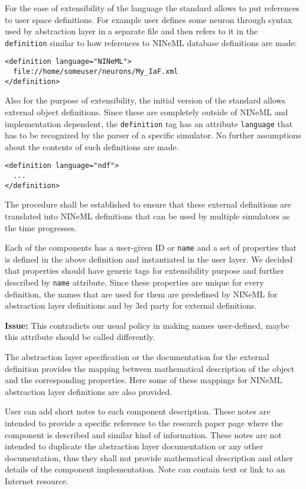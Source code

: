 \documentclass{article}
\newcommand{\issue}[1]{%
\begin{center}
\colorbox{issuecolor}{\parbox{0.8\linewidth}{\textbf{Issue:} #1}}
\end{center}%
}
\begin{document}
For the ease of extensibility of the language the standard
allows to put references to user space definitions. For example user defines some
neuron through syntax used by abstraction layer in a separate file and then refers
to it in the {\tt definition} similar to how references to NINeML database definitions
are made:
\begin{verbatim}
<definition language="NINeML">
  file://home/someuser/neurons/My_IaF.xml
</definition>
\end{verbatim}

Also for the purpose of extensibility, the initial version of the standard allows
external object definitions. Since these are completely outside of NINeML and
implementation dependent, the {\tt definition} tag has an attribute {\tt language}
that has to be recognized by the parser of a specific simulator. No further
assumptions about the contents of such definitions are made.
\begin{verbatim}
<definition language="ndf">
  ...
</definition>
\end{verbatim}
The procedure shall be established to ensure that these external definitions
are translated into NINeML definitions that can be used by multiple simulators
as the time progresses.

Each of the components has a user-given ID or {\tt name} and a set of properties
that is defined in the above definition and instantiated in the user layer.
We decided that properties should have generic tags for extensibility purpose
and further described by {\tt name} attribute. Since these properties are unique
for every definition, the names that are used for them are predefined by NINeML
for abstraction layer definitions and by 3rd party for external
definitions.

\issue{This contradicts our usual policy in making names user-defined,
maybe this attribute should be called differently.}

The abstraction layer specification or the documentation for the external definition
provides the mapping between mathematical description of the object and the
corresponding properties. Here some of these mappings for NINeML abstraction
layer definitions are also provided.

User can add short notes to each component description. These notes are
intended to provide a specific reference to the research paper page
where the component is described and similar kind of information. These
notes are not intended to duplicate the abstraction layer documentation
or any other documentation, thus they shall not provide mathematical
description and other details of the component implementation. Note can
contain text or link to an Internet resource.
\end{document}
